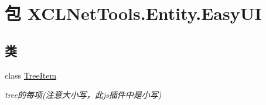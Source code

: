 \hypertarget{namespace_x_c_l_net_tools_1_1_entity_1_1_easy_u_i}{\section{包 X\-C\-L\-Net\-Tools.\-Entity.\-Easy\-U\-I}
\label{namespace_x_c_l_net_tools_1_1_entity_1_1_easy_u_i}
}
\subsection*{类}
\begin{DoxyCompactItemize}
\item 
class \hyperlink{class_x_c_l_net_tools_1_1_entity_1_1_easy_u_i_1_1_tree_item}{Tree\-Item}
\begin{DoxyCompactList}\small\item\em tree的每项(注意大小写，此js插件中是小写) \end{DoxyCompactList}\end{DoxyCompactItemize}
